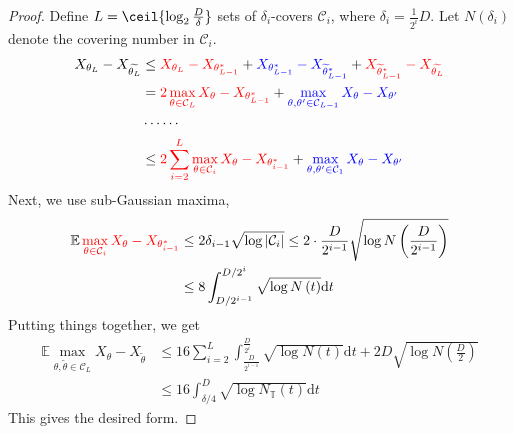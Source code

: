 \begin{proof}
Define $L = \ceil{\log_2 \frac{D}{\delta} }$ sets of $\delta_i$-covers $\mathcal{C}_i$, where $\delta_i = \frac{1}{2^i}D$. Let $N(\delta_i)$ denote the covering number in $\mathcal{C}_i$.
\begin{align*}
X_{\theta_{L}}-X_{\widetilde{\theta_{L}}} & \leq {\color{red} X_{\theta_L}-X_{\theta^*_{L-1}}} + {\color{blue} X_{\theta^*_{L-1}}-X_{\widetilde{\theta}^*_{L-1}}}+{\color{red}X_{\widetilde{\theta}^{\star}_{L-1}}-X_{\widetilde{\theta_L}}} \\
&= {\color{red} 2 \max _{\theta \in \mathcal{C}_{L}} X_{\theta}-X_{\theta^*_{L-1}}} + {\color{blue}\max_{\theta, \theta^{\prime} \in \mathcal{C}_{L-1}} X_{\theta}-X_{\theta^{\prime}}} \\
& \cdots\cdots \\
& \leq  {\color{red}2 \sum_{i=2}^{L} \max_{\theta \in \mathcal{C}_{i}} X_{\theta}-X_{\theta^*_{i-1}}} + {\color{blue}\max _{\theta, \theta^{\prime} \in \mathcal{C}_{1}} X_{\theta}-X_{\theta^{\prime}}}
\end{align*}
Next, we use sub-Gaussian maxima,
\begin{align*}
    \mathbb{E} \, {\color{red}\max_{\theta \in \mathcal{C}_{i}} X_{\theta}-X_{\theta^*_{i-1}}} & \leq 2 \delta_{i-1} \sqrt{\log |\mathcal{C}_i|} \leq 2 \cdot \frac{D}{2^{i-1}} \sqrt{\log N\left(\frac{D}{2^{i-1}}\right)} \\
    & \leq 8 \int_{D/2^{i-1}}^{D/2^i} \sqrt{\log N\left(t\right)} \mathrm{d} t
\end{align*}
Putting things together, we get
\begin{align*}
\mathbb{E} \max _{\theta, \tilde{\theta} \in \mathcal{C}_{L}} X_{\theta}-X_{\tilde{\theta}} & \leq 16 \sum_{i=2}^{L}\int_{\frac{D}{2^{i-1}}}^{\frac{D}{2^i}} \sqrt{\log N\left(t\right)} \mathrm{d} t + 2 D \sqrt{\log N\left(\frac{D}{2}\right)} \\
& \leq 16 \int_{\delta / 4}^{D} \sqrt{\log N_{\mathbb{T}}(t)} \mathrm{d} t
\end{align*}
This gives the desired form.
\end{proof}


